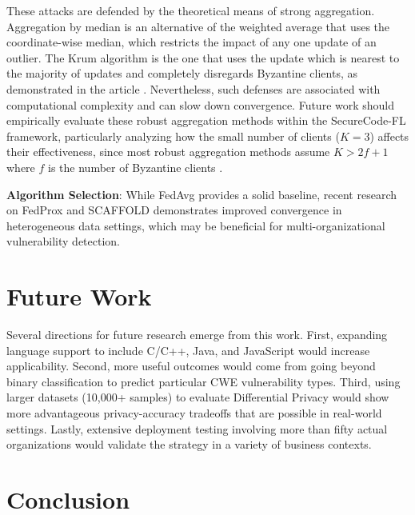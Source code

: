 \documentclass[pdflatex,sn-mathphys-num]{sn-jnl}
\theoremstyle{thmstyleone}%
\theoremstyle{thmstyletwo}%
\theoremstyle{thmstylethree}%
\begin{document}
These attacks are defended by the theoretical means of strong aggregation. Aggregation by median is an alternative of the weighted average that uses the coordinate-wise median, which restricts the impact of any one update of an outlier. The Krum algorithm is the one that uses the update which is nearest to the majority of updates and completely disregards Byzantine clients, as demonstrated in the article \cite{kim2024breakwater}. Nevertheless, such defenses are associated with computational complexity and can slow down convergence. Future work should empirically evaluate these robust aggregation methods within the SecureCode-FL framework, particularly analyzing how the small number of clients ($K=3$) affects their effectiveness, since most robust aggregation methods assume $K > 2f + 1$ where $f$ is the number of Byzantine clients \cite{li2025explainablefl, fang2024flattack}.

\textbf{Algorithm Selection}: While FedAvg provides a solid baseline, recent research on FedProx \cite{li2024fedprox} and SCAFFOLD \cite{karimireddy2024scaffold} demonstrates improved convergence in heterogeneous data settings, which may be beneficial for multi-organizational vulnerability detection.



\section{Future Work}\label{sec:future}

Several directions for future research emerge from this work. First, expanding language support to include C/C++, Java, and JavaScript would increase applicability. Second, more useful outcomes would come from going beyond binary classification to predict particular CWE vulnerability types. Third, using larger datasets (10,000+ samples) to evaluate Differential Privacy would show more advantageous privacy-accuracy tradeoffs that are possible in real-world settings. Lastly, extensive deployment testing involving more than fifty actual organizations would validate the strategy in a variety of business contexts.


\section{Conclusion}\label{sec:conclusion}
\end{document}
